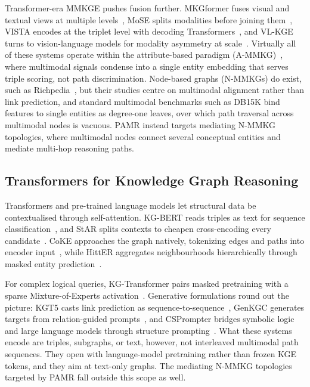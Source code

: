 \documentclass[runningheads]{llncs}
\begin{document}
Transformer-era MMKGE pushes fusion further. MKGformer fuses visual and textual views at multiple levels~\cite{chen2022mkgformer}, MoSE splits modalities before joining them~\cite{zhao2022mose}, VISTA encodes at the triplet level with decoding Transformers~\cite{lee2023vista}, and VL-KGE turns to vision-language models for modality asymmetry at scale~\cite{efthymiou2026vlkge}. Virtually all of these systems operate within the attribute-based paradigm (A-MMKG)~\cite{zhu2024multimodal}, where
multimodal signals condense into a single entity embedding that serves triple scoring, not path discrimination. Node-based graphs (N-MMKGs) do exist, such as Richpedia~\cite{wang2020richpedia}, but their studies centre on multimodal alignment rather than link prediction, and standard multimodal benchmarks such as DB15K bind features to single entities as degree-one leaves, over which path traversal across multimodal nodes is vacuous. PAMR instead targets mediating N-MMKG topologies, where multimodal nodes connect several conceptual entities and mediate multi-hop reasoning paths.

\subsection{Transformers for Knowledge Graph Reasoning}
\label{sec:rw-transformers}

Transformers and pre-trained language models let structural data be contextualised through self-attention. KG-BERT reads triples as text for sequence classification~\cite{yao2019kg}, and StAR splits contexts to cheapen cross-encoding every candidate~\cite{wang2021star}. CoKE approaches the graph natively, tokenizing edges and paths into encoder input~\cite{wang2019coke}, while HittER aggregates neighbourhoods hierarchically through masked entity prediction~\cite{chen2021hitter}.

For complex logical queries, KG-Transformer pairs masked pretraining with a sparse Mixture-of-Experts activation~\cite{liu2022mask}. Generative formulations round out the picture: KGT5 casts link prediction as sequence-to-sequence~\cite{saxena2022kgt5}, GenKGC generates targets from relation-guided prompts~\cite{zhu2022genkgc}, and CSPrompter bridges symbolic logic and large language models through structure prompting~\cite{chen2023csprompter}. What these systems encode are triples, subgraphs, or text, however, not interleaved multimodal path sequences. They open with language-model pretraining rather than frozen KGE tokens, and they aim at text-only graphs. The mediating N-MMKG topologies targeted by PAMR fall outside this scope as well.
\end{document}
